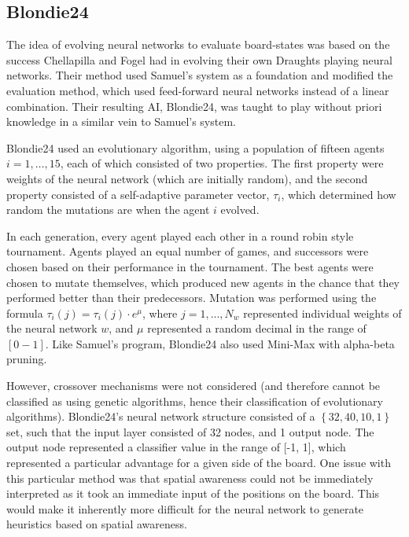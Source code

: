 \documentclass[12pt,a4paper]{article}
\begin{document}
    \subsection{Blondie24}
        The idea of evolving neural networks to evaluate board-states was based on the success Chellapilla and Fogel had in evolving their own Draughts playing neural networks. Their method used Samuel's system as a foundation and modified the evaluation method, which used feed-forward neural networks instead of a linear combination. Their resulting AI, Blondie24, was taught to play without priori knowledge in a similar vein to Samuel's system. \cite{chellapilla_evolving_1999}

        Blondie24 used an evolutionary algorithm, using a population of fifteen agents $i=1,\dots,15$, each of which consisted of two properties. The first property were weights of the neural network (which are initially random), and the second property consisted of a self-adaptive parameter vector, $\tau_i$, which determined how random the mutations are when the agent $i$ evolved.
    
        In each generation, every agent played each other in a round robin style tournament. Agents played an equal number of games, and successors were chosen based on their performance in the tournament. The best agents were chosen to mutate themselves, which produced new agents in the chance that they performed better than their predecessors. Mutation was performed using the formula $\tau_i(j) = \tau_i(j) \cdot e^{\mu}$, where $j=1,...,N_w$ represented individual weights of the neural network $w$, and $\mu$ represented a random decimal in the range of $[0-1]$. Like Samuel's program, Blondie24 also used Mini-Max with alpha-beta pruning.

        However, crossover mechanisms were not considered (and therefore cannot be classified as using genetic algorithms, hence their classification of evolutionary algorithms). Blondie24's neural network structure consisted of a $\left\{ 32,40,10,1 \right\}$ set, such that the input layer consisted of 32 nodes, and 1 output node. The output node represented a classifier value in the range of [-1, 1], which represented a particular advantage for a given side of the board. One issue with this particular method was that spatial awareness could not be immediately interpreted as it took an immediate input of the positions on the board. This would make it inherently more difficult for the neural network to generate heuristics based on spatial awareness.
\end{document}
